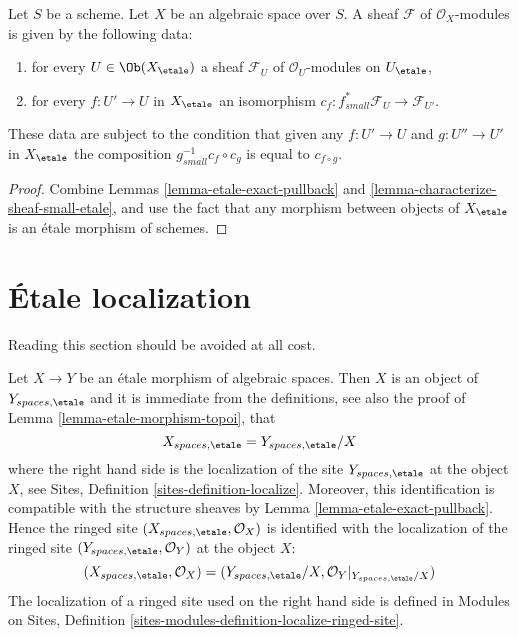 \begin{lemma}
\label{lemma-characterize-module-small-etale}
Let $S$ be a scheme. Let $X$ be an algebraic space over $S$.
A sheaf $\mathcal{F}$ of $\mathcal{O}_X$-modules is given by the following
data:
\begin{enumerate}
\item for every $U \in \Ob(X_\etale)$ a sheaf
$\mathcal{F}_U$ of $\mathcal{O}_U$-modules on $U_\etale$,
\item for every $f : U' \to U$ in $X_\etale$ an isomorphism
$c_f : f_{small}^*\mathcal{F}_U \to \mathcal{F}_{U'}$.
\end{enumerate}
These data are subject to the condition that given any $f : U' \to U$
and $g : U'' \to U'$ in $X_\etale$ the composition
$g_{small}^{-1}c_f \circ c_g$ is equal to $c_{f \circ g}$.
\end{lemma}

\begin{proof}
Combine Lemmas \ref{lemma-etale-exact-pullback}
and \ref{lemma-characterize-sheaf-small-etale}, and use the fact that
any morphism between objects of $X_\etale$ is an \'etale morphism
of schemes.
\end{proof}







\section{\'Etale localization}
\label{section-localize}

\noindent
Reading this section should be avoided at all cost.

\medskip\noindent
Let $X \to Y$ be an \'etale morphism of algebraic spaces.
Then $X$ is an object of $Y_{spaces, \etale}$ and it is
immediate from the definitions, see also the proof of
Lemma \ref{lemma-etale-morphism-topoi},
that
\begin{equation}
\label{equation-localize}
X_{spaces, \etale} = Y_{spaces, \etale}/X
\end{equation}
where the right hand side is the localization of the site
$Y_{spaces, \etale}$ at the object $X$, see
Sites, Definition \ref{sites-definition-localize}.
Moreover, this identification is compatible with the structure sheaves by
Lemma \ref{lemma-etale-exact-pullback}.
Hence the ringed site $(X_{spaces, \etale}, \mathcal{O}_X)$
is identified with the localization of the ringed site
$(Y_{spaces, \etale}, \mathcal{O}_Y)$ at the object $X$:
\begin{equation}
\label{equation-localize-ringed}
(X_{spaces, \etale}, \mathcal{O}_X) =
(Y_{spaces, \etale}/X, \mathcal{O}_Y|_{Y_{spaces, \etale}/X})
\end{equation}
The localization of a ringed site used on the right hand side is defined in
Modules on Sites,
Definition \ref{sites-modules-definition-localize-ringed-site}.

